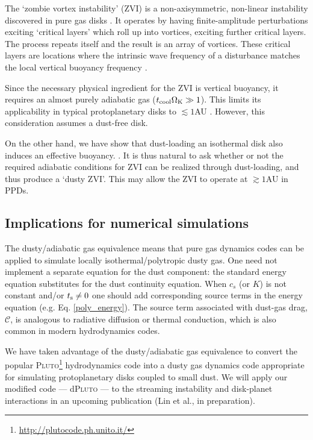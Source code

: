 The `zombie vortex instability' (ZVI) is a non-axisymmetric,
non-linear instability discovered in pure gas disks
\citep{marcus15,umurhan16d}. It operates by having finite-amplitude perturbations
exciting `critical layers' which roll 
up into vortices, exciting further critical layers. The process
repeats itself and the result is an array of vortices. These critical 
layers are locations where the intrinsic wave frequency of a 
disturbance matches the local vertical buoyancy frequency 
\citep{marcus13}.  

Since the necessary physical ingredient for the ZVI is vertical
buoyancy, it requires an almost purely adiabatic gas ($t_\mathrm{cool}\Omega_{\rm K}\gg
1$). This limits its applicability in typical protoplanetary disks to 
$\lesssim 1$AU \citep{lesur16, malygin17}. However, this consideration
assumes a dust-free disk.  

On the other hand, we have show that dust-loading an isothermal disk
also induces an effective buoyancy. %
. It is thus natural to ask whether or not
the required adiabatic conditions for ZVI can be realized through
dust-loading, and thus produce a `dusty ZVI'. This may allow the ZVI
to operate at $\gtrsim 1$AU in PPDs. 

\subsection{Implications for numerical simulations}
The dusty/adiabatic gas equivalence means that pure
gas dynamics codes can be applied to simulate locally
isothermal/polytropic dusty gas. One need not implement a separate 
equation for the dust component: 
 the standard energy equation substitutes for the dust continuity
equation. When $c_s$ (or $K$) is not constant and/or $t_\mathrm{s}\neq0$ one
should add corresponding source terms in the energy equation
(e.g. Eq. \ref{poly_energy}). 
The source term associated with dust-gas drag, $\mathcal{C}$, is 
analogous to radiative diffusion \citep{price15} or thermal
conduction, which is also common in modern hydrodynamics codes.       

We have taken advantage of the dusty/adiabatic gas equivalence to 
convert the popular
\textsc{Pluto}\footnote{\url{http://plutocode.ph.unito.it/}}      
hydrodynamics code into a dusty gas dynamics code appropriate for
simulating protoplanetary disks coupled to small dust. We will apply 
our modified code --- d\textsc{Pluto} --- to the streaming instability
and disk-planet interactions in an upcoming publication (Lin et al.,
in preparation).   

